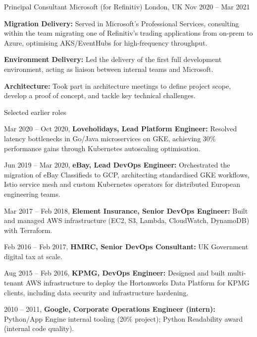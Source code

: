 \begin{cventries}
  \cventry
  {Principal Consultant}
  {Microsoft (for Refinitiv)}
  {London, UK}
  {Nov 2020 -- Mar 2021}
  {
    \begin{cvitems}
      \item {\textbf{Migration Delivery:} Served in Microsoft's Professional Services, consulting within the team migrating one of Refinitiv's trading applications from on-prem to Azure, optimising AKS/EventHubs for high-frequency throughput.}
      \item {\textbf{Environment Delivery:} Led the delivery of the first full development environment, acting as liaison between internal teams and Microsoft.}
      \item {\textbf{Architecture:} Took part in architecture meetings to define project scope, develop a proof of concept, and tackle key technical challenges.}
    \end{cvitems}
  }

  \cventry
  {Selected earlier roles}
  {}
  {}
  {}
  {
    \begin{cvitems}
      \item {Mar 2020 -- Oct 2020, \textbf{Loveholidays, Lead Platform Engineer:} Resolved latency bottlenecks in Go/Java microservices on GKE, achieving 30\% performance gains through Kubernetes autoscaling optimisation.}
      \item {Jun 2019 -- Mar 2020, \textbf{eBay, Lead DevOps Engineer:} Orchestrated the migration of eBay Classifieds to GCP, architecting standardised GKE workflows, Istio service mesh and custom Kubernetes operators for distributed European engineering teams.}
      \item {Mar 2017 -- Feb 2018, \textbf{Element Insurance, Senior DevOps Engineer:} Built and managed AWS infrastructure (EC2, S3, Lambda, CloudWatch, DynamoDB) with Terraform.}
      \item {Feb 2016 -- Feb 2017, \textbf{HMRC, Senior DevOps Consultant:} UK Government digital tax at scale.}
      \item {Aug 2015 -- Feb 2016, \textbf{KPMG, DevOps Engineer:} Designed and built multi-tenant AWS infrastructure to deploy the Hortonworks Data Platform for KPMG clients, including data security and infrastructure hardening.}
      \item {2010 -- 2011, \textbf{Google, Corporate Operations Engineer (intern):} Python/App Engine internal tooling (20\% project); Python Readability award (internal code quality).}
    \end{cvitems}
  }

\end{cventries}

